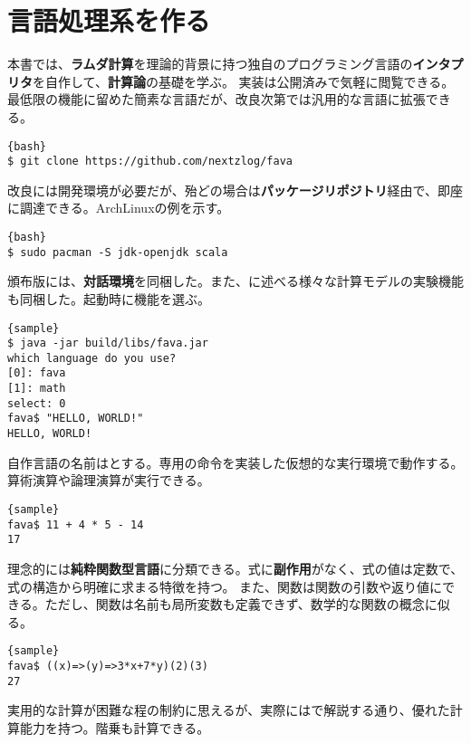 \documentclass[10pt,a4paper]{book}
\begin{document}
\maketitle
\tableofcontents

\chapter{言語処理系を作る}

本書では、\textbf{ラムダ計算}を理論的背景に持つ独自のプログラミング言語の\textbf{インタプリタ}を自作して、\textbf{計算論}の基礎を学ぶ。
実装は公開済みで気軽に閲覧できる。最低限の機能に留めた簡素な言語だが、改良次第では汎用的な言語に拡張できる。

\begin{Verbatim}{bash}
$ git clone https://github.com/nextzlog/fava
\end{Verbatim}

改良には開発環境が必要だが、殆どの場合は\textbf{パッケージリポジトリ}経由で、即座に調達できる。ArchLinuxの例を示す。

\begin{Verbatim}{bash}
$ sudo pacman -S jdk-openjdk scala
\end{Verbatim}

頒布版には、\textbf{対話環境}を同梱した。また、に述べる様々な計算モデルの実験機能も同梱した。起動時に機能を選ぶ。

\begin{Verbatim}{sample}
$ java -jar build/libs/fava.jar
which language do you use?
[0]: fava
[1]: math
select: 0
fava$ "HELLO, WORLD!"
HELLO, WORLD!
\end{Verbatim}

自作言語の名前は\fava{}とする。専用の命令を実装した仮想的な実行環境で動作する。算術演算や論理演算が実行できる。

\begin{Verbatim}{sample}
fava$ 11 + 4 * 5 - 14
17
\end{Verbatim}

理念的には\textbf{純粋関数型言語}に分類できる。式に\textbf{副作用}がなく、式の値は定数で、式の構造から明確に求まる特徴を持つ。
また、関数は関数の引数や返り値にできる。ただし、関数は名前も局所変数も定義できず、数学的な関数の概念に似る。

\begin{Verbatim}{sample}
fava$ ((x)=>(y)=>3*x+7*y)(2)(3)
27
\end{Verbatim}

実用的な計算が困難な程の制約に思えるが、実際にはで解説する通り、優れた計算能力を持つ。階乗も計算できる。
\end{document}
